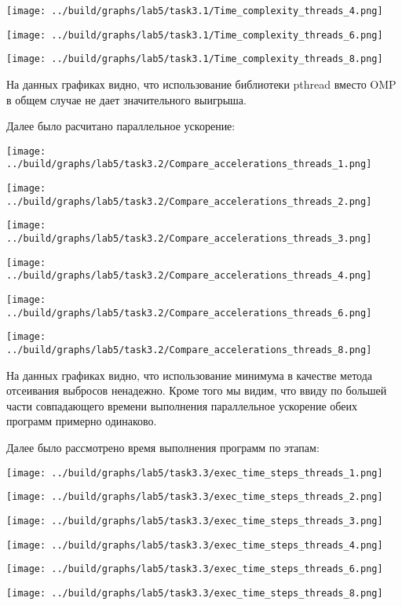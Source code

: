\documentclass[14pt, a4paper, oneside, final]{extarticle}
\begin{document}
\texttt{[image: ../build/graphs/lab5/task3.1/Time\_complexity\_threads\_4.png]}

\texttt{[image: ../build/graphs/lab5/task3.1/Time\_complexity\_threads\_6.png]}

\texttt{[image: ../build/graphs/lab5/task3.1/Time\_complexity\_threads\_8.png]}

На данных графиках видно, что использование библиотеки pthread вместо OMP в общем случае не дает значительного выигрыша.

Далее было расчитано параллельное ускорение:

\texttt{[image: ../build/graphs/lab5/task3.2/Compare\_accelerations\_threads\_1.png]}

\texttt{[image: ../build/graphs/lab5/task3.2/Compare\_accelerations\_threads\_2.png]}

\texttt{[image: ../build/graphs/lab5/task3.2/Compare\_accelerations\_threads\_3.png]}

\texttt{[image: ../build/graphs/lab5/task3.2/Compare\_accelerations\_threads\_4.png]}

\texttt{[image: ../build/graphs/lab5/task3.2/Compare\_accelerations\_threads\_6.png]}

\texttt{[image: ../build/graphs/lab5/task3.2/Compare\_accelerations\_threads\_8.png]}

На данных графиках видно, что использование минимума в качестве метода отсеивания выбросов ненадежно.
Кроме того мы видим, что ввиду по большей части совпадающего времени выполнения параллельное ускорение обеих программ примерно одинаково.

Далее было рассмотрено время выполнения программ по этапам:

\texttt{[image: ../build/graphs/lab5/task3.3/exec\_time\_steps\_threads\_1.png]}

\texttt{[image: ../build/graphs/lab5/task3.3/exec\_time\_steps\_threads\_2.png]}

\texttt{[image: ../build/graphs/lab5/task3.3/exec\_time\_steps\_threads\_3.png]}

\texttt{[image: ../build/graphs/lab5/task3.3/exec\_time\_steps\_threads\_4.png]}

\texttt{[image: ../build/graphs/lab5/task3.3/exec\_time\_steps\_threads\_6.png]}

\texttt{[image: ../build/graphs/lab5/task3.3/exec\_time\_steps\_threads\_8.png]}
\end{document}
